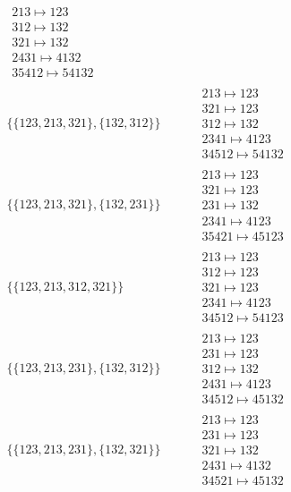 \begin{tiny}
\begin{align}
\begin{matrix}
213 \mapsto 123\\312 \mapsto 132\\321 \mapsto 132\\2431 \mapsto 4132\\35412 \mapsto 54132
\end{matrix}
\\
\{\{123, 213, 321\}, \{132, 312\}\}
\quad
&
\phantom{.}
&
\begin{matrix}
213 \mapsto 123\\321 \mapsto 123\\312 \mapsto 132\\2341 \mapsto 4123\\34512 \mapsto 54132
\end{matrix}
\\
\{\{123, 213, 321\}, \{132, 231\}\}
\quad
&
\phantom{.}
&
\begin{matrix}
213 \mapsto 123\\321 \mapsto 123\\231 \mapsto 132\\2341 \mapsto 4123\\35421 \mapsto 45123
\end{matrix}
\\
\{\{123, 213, 312, 321\}\}
\quad
&
\phantom{.}
&
\begin{matrix}
213 \mapsto 123\\312 \mapsto 123\\321 \mapsto 123\\2341 \mapsto 4123\\34512 \mapsto 54123
\end{matrix}
\\
\{\{123, 213, 231\}, \{132, 312\}\}
\quad
&
\phantom{.}
&
\begin{matrix}
213 \mapsto 123\\231 \mapsto 123\\312 \mapsto 132\\2431 \mapsto 4123\\34512 \mapsto 45132
\end{matrix}
\\
\{\{123, 213, 231\}, \{132, 321\}\}
\quad
&
\phantom{.}
&
\begin{matrix}
213 \mapsto 123\\231 \mapsto 123\\321 \mapsto 132\\2431 \mapsto 4132\\34521 \mapsto 45132
\end{matrix}
\\

\end{align}
\end{tiny}
